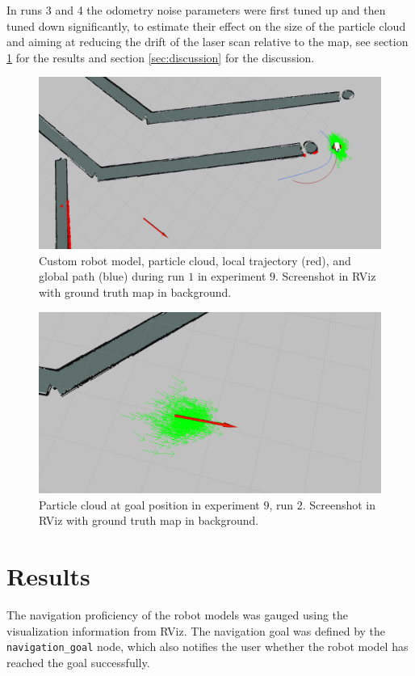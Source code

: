 \documentclass[10pt,journal,compsoc]{IEEEtran}
\begin{document}
In runs 3 and 4 the odometry noise parameters were first tuned up and then tuned down significantly, to estimate their effect on the size of the particle cloud and aiming at reducing the drift of the laser scan relative to the map, see section \ref{sec:results} for the results and section \ref{sec:discussion} for the discussion.

\begin{figure}[thpb]
      \centering
      \includegraphics[width=\linewidth]{images/exp_9_run_1.PNG}
      \caption{Custom robot model, particle cloud, local trajectory (red), and global path (blue) during run $1$ in experiment $9$. Screenshot in RViz with ground truth map in background.}
      \label{fig:result_experiment_9-1}
\end{figure}

\begin{figure}[thpb]
      \centering
      \includegraphics[width=\linewidth]{images/exp_9_run_2_goal.PNG}
      \caption{Particle cloud at goal position in experiment $9$, run $2$. Screenshot in RViz with ground truth map in background.}
      \label{fig:result_experiment_9-2}
\end{figure}

\section{Results}
\label{sec:results}
The navigation proficiency of the robot models was gauged using the visualization information from RViz. The navigation goal was defined by the \texttt{navigation\_goal} node, which also notifies the user whether the robot model has reached the goal successfully.
\end{document}
